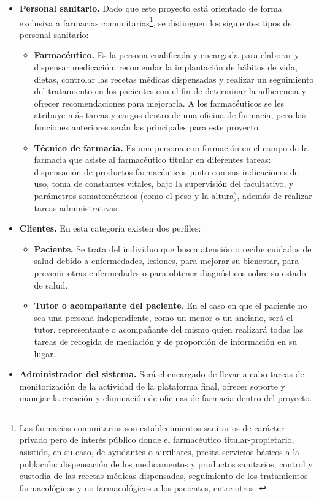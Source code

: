 \begin{itemize}
	\item \textbf{Personal sanitario.} Dado que este proyecto está orientado de forma exclusiva a farmacias comunitarias\footnote{Las farmacias comunitarias son establecimientos sanitarios de carácter privado pero de interés público donde el farmacéutico titular-propietario, asistido, en su caso, de ayudantes o auxiliares, presta servicios básicos a la población: dispensación de los medicamentos y productos sanitarios, control y custodia de las recetas médicas dispensadas, seguimiento de los tratamientos farmacológicos y no farmacológicos a los pacientes, entre otros. \cite{Ley16_1997}}, se distinguen los siguientes tipos de personal sanitario:
	\begin{itemize}
		\item \textbf{Farmacéutico.} Es la persona cualificada y encargada para elaborar y dispensar medicación, recomendar la implantación de hábitos de vida, dietas, controlar las recetas médicas dispensadas y realizar un seguimiento del tratamiento en los pacientes con el fin de determinar la adherencia y ofrecer recomendaciones para mejorarla. A los farmacéuticos se les atribuye más tareas y cargos dentro de una oficina de farmacia, pero las  funciones anteriores serán las principales para este proyecto.
		
		\item \textbf{Técnico de farmacia.} Es una persona con formación en el campo de la farmacia que asiste al farmacéutico titular en diferentes tareas: dispensación de productos farmacéuticos junto con sus indicaciones de uso, toma de constantes vitales, bajo la supervisión del facultativo, y parámetros somatométricos (como el peso y la altura), además de realizar tareas administrativas.
	\end{itemize}

	\item \textbf{Clientes.} En esta categoría existen dos perfiles:
	\begin{itemize}
		\item \textbf{Paciente.} Se trata del individuo que busca atención o recibe cuidados de salud debido a enfermedades, lesiones, para mejorar su bienestar, para prevenir otras enfermedades o para obtener diagnósticos sobre su estado de salud. \cite{UniNavarra}
		
		\item \textbf{Tutor o acompañante del paciente}. En el caso en que el paciente no sea una persona independiente, como un menor o un anciano, será el tutor, representante o acompañante del mismo quien realizará todas las tareas de recogida de mediación y de proporción de información en su lugar.
	\end{itemize}

	\item \textbf{Administrador del sistema.} Será el encargado de llevar a cabo tareas de monitorización de la actividad de la plataforma final, ofrecer soporte y manejar la creación y eliminación de oficinas de farmacia dentro del proyecto. 
\end{itemize}

